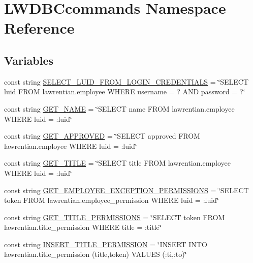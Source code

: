 \hypertarget{namespace_l_w_d_b_ccommands}{}\section{L\+W\+D\+B\+Ccommands Namespace Reference}
\label{namespace_l_w_d_b_ccommands}
\subsection*{Variables}
\begin{DoxyCompactItemize}
\item 
const string \hyperlink{namespace_l_w_d_b_ccommands_af30578b8b16007ee496a1984487b9fc5}{S\+E\+L\+E\+C\+T\+\_\+\+L\+U\+I\+D\+\_\+\+F\+R\+O\+M\+\_\+\+L\+O\+G\+I\+N\+\_\+\+C\+R\+E\+D\+E\+N\+T\+I\+A\+L\+S} = \char`\"{}S\+E\+L\+E\+C\+T luid F\+R\+O\+M lawrentian.\+employee W\+H\+E\+R\+E username = ? A\+N\+D password = ?\char`\"{}
\item 
const string \hyperlink{namespace_l_w_d_b_ccommands_a6dcdf2d4cdf87e217b4c8a5c3be048c9}{G\+E\+T\+\_\+\+N\+A\+M\+E} = \char`\"{}S\+E\+L\+E\+C\+T name F\+R\+O\+M lawrentian.\+employee W\+H\+E\+R\+E luid = \+:luid\char`\"{}
\item 
const string \hyperlink{namespace_l_w_d_b_ccommands_a9b4deb87585d30ea401b83064fa5519b}{G\+E\+T\+\_\+\+A\+P\+P\+R\+O\+V\+E\+D} = \char`\"{}S\+E\+L\+E\+C\+T approved F\+R\+O\+M lawrentian.\+employee W\+H\+E\+R\+E luid = \+:luid\char`\"{}
\item 
const string \hyperlink{namespace_l_w_d_b_ccommands_a036f332657ac52041a58c6b08d353016}{G\+E\+T\+\_\+\+T\+I\+T\+L\+E} = \char`\"{}S\+E\+L\+E\+C\+T title F\+R\+O\+M lawrentian.\+employee W\+H\+E\+R\+E luid = \+:luid\char`\"{}
\item 
const string \hyperlink{namespace_l_w_d_b_ccommands_a056cd3ecf83a40957cb6abc1b82b4c73}{G\+E\+T\+\_\+\+E\+M\+P\+L\+O\+Y\+E\+E\+\_\+\+E\+X\+C\+E\+P\+T\+I\+O\+N\+\_\+\+P\+E\+R\+M\+I\+S\+S\+I\+O\+N\+S} = \char`\"{}S\+E\+L\+E\+C\+T token F\+R\+O\+M lawrentian.\+employee\+\_\+permission W\+H\+E\+R\+E luid = \+:luid\char`\"{}
\item 
const string \hyperlink{namespace_l_w_d_b_ccommands_a206fef094a70286865709618b9d9423c}{G\+E\+T\+\_\+\+T\+I\+T\+L\+E\+\_\+\+P\+E\+R\+M\+I\+S\+S\+I\+O\+N\+S} = \char`\"{}S\+E\+L\+E\+C\+T token F\+R\+O\+M lawrentian.\+title\+\_\+permission W\+H\+E\+R\+E title = \+:title\char`\"{}
\item 
const string \hyperlink{namespace_l_w_d_b_ccommands_a5b265e16bb6a1a02c236cda01cd71bce}{I\+N\+S\+E\+R\+T\+\_\+\+T\+I\+T\+L\+E\+\_\+\+P\+E\+R\+M\+I\+S\+S\+I\+O\+N} = \char`\"{}I\+N\+S\+E\+R\+T I\+N\+T\+O lawrentian.\+title\+\_\+permission (title,token) V\+A\+L\+U\+E\+S (\+:ti,\+:to)\char`\"{}

\end{DoxyCompactItemize}
